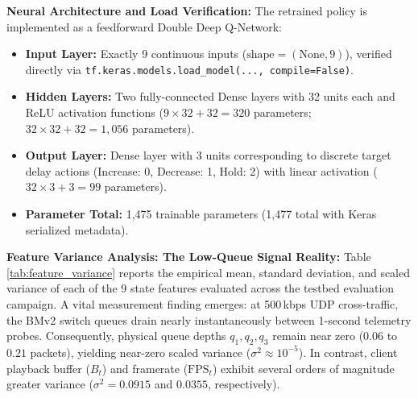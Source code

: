 \documentclass[12pt,a4paper,oneside]{report}
\begin{document}
\textbf{Neural Architecture and Load Verification:}
The retrained policy is implemented as a feedforward Double Deep Q-Network:
\begin{itemize}
  \item \textbf{Input Layer:} Exactly 9 continuous inputs ($\text{shape} = (\text{None}, 9)$), verified directly via \texttt{tf.keras.models.load\_model(..., compile=False)}.
  \item \textbf{Hidden Layers:} Two fully-connected Dense layers with 32 units each and ReLU activation functions ($9 \times 32 + 32 = 320$ parameters; $32 \times 32 + 32 = 1,056$ parameters).
  \item \textbf{Output Layer:} Dense layer with 3 units corresponding to discrete target delay actions (Increase: 0, Decrease: 1, Hold: 2) with linear activation ($32 \times 3 + 3 = 99$ parameters).
  \item \textbf{Parameter Total:} 1,475 trainable parameters (1,477 total with Keras serialized metadata).
\end{itemize}

\textbf{Feature Variance Analysis: The Low-Queue Signal Reality:}
Table \ref{tab:feature_variance} reports the empirical mean, standard deviation, and scaled variance of each of the 9 state features evaluated across the testbed evaluation campaign. A vital measurement finding emerges: at 500\,kbps UDP cross-traffic, the BMv2 switch queues drain nearly instantaneously between 1-second telemetry probes. Consequently, physical queue depths $q_1, q_2, q_3$ remain near zero ($0.06$ to $0.21$ packets), yielding near-zero scaled variance ($\sigma^2 \approx 10^{-5}$). In contrast, client playback buffer ($B_t$) and framerate ($\text{FPS}_t$) exhibit several orders of magnitude greater variance ($\sigma^2 = 0.0915$ and $0.0355$, respectively).
\end{document}

